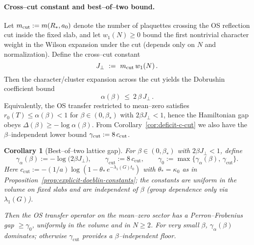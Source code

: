 \documentclass[11pt]{amsart}
\theoremstyle{plain}
\newtheorem{corollary}[theorem]{Corollary}
\theoremstyle{definition}
\theoremstyle{remark}
\begin{document}
\paragraph{Cross--cut constant and best--of--two bound.}
Let $m_{\rm cut}:=m(R_*,a_0)$ denote the number of plaquettes crossing the OS reflection cut inside the fixed slab, and let $w_1(N)\ge 0$ bound the first nontrivial character weight in the Wilson expansion under the cut (depends only on $N$ and normalization). Define the cross--cut constant
\[
  J_{\perp}
  \ :=\ m_{\rm cut}\,w_1(N)\,.
\]
Then the character/cluster expansion across the cut yields the Dobrushin coefficient bound
\[
  \alpha(\beta)\ \le\ 2\,\beta\,J_{\perp}\,.
\]
Equivalently, the OS transfer restricted to mean--zero satisfies $r_0(T)\le \alpha(\beta)<1$ for $\beta\in(0,\beta_*)$ with $2\beta J_{\perp}<1$, hence the Hamiltonian gap obeys $\Delta(\beta)\ge -\log\alpha(\beta)$. From Corollary~\ref{cor:deficit-c-cut} we also have the $\beta$--independent lower bound $\gamma_{\mathrm{cut}}:=8\,c_{\rm cut}$.

\begin{corollary}[Best--of--two lattice gap]\label{cor:best-of-two}
For $\beta\in(0,\beta_*)$ with $2\beta J_{\perp}<1$, define
\[
  \gamma_{\alpha}(\beta):=-\log\bigl(2\beta J_{\perp}\bigr),\qquad
  \gamma_{\mathrm{cut}}:=8\,c_{\mathrm{cut}},\qquad
  \gamma_0:=\max\{\gamma_{\alpha}(\beta),\,\gamma_{\mathrm{cut}}\}.
\]
Here $c_{\mathrm{cut}} := -(1/a)\log(1-\theta_*\, e^{-\lambda_1(G) t_0})$ with $\theta_* = \kappa_0$ as in Proposition~\ref{prop:explicit-doeblin-constants}; the constants are uniform in the volume on fixed slabs and are independent of $\beta$ (group dependence only via $\lambda_1(G)$).

Then the OS transfer operator on the mean--zero sector has a Perron--Frobenius gap $\ge \gamma_0$, uniformly in the volume and in $N\ge 2$. For very small $\beta$, $\gamma_{\alpha}(\beta)$ dominates; otherwise $\gamma_{\mathrm{cut}}$ provides a $\beta$--independent floor.
\end{corollary}

\paragraph{}
\end{document}
